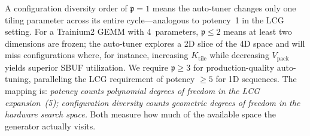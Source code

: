 \documentclass[12pt]{article}
\newcommand{\ConfigDiversity}{\mathfrak{p}}       %
\newcommand{\SBUF}{\textsc{SBUF}}                 %
\begin{document}
\noindent A configuration diversity order of $\ConfigDiversity = 1$ means the auto-tuner changes only one tiling parameter across its entire cycle---analogous to potency~1 in the LCG setting. For a Trainium2 GEMM with 4~parameters, $\ConfigDiversity \le 2$ means at least two dimensions are frozen; the auto-tuner explores a 2D slice of the 4D space and will miss configurations where, for instance, increasing $K_{\mathrm{tile}}$ while decreasing $V_{\mathrm{pack}}$ yields superior \SBUF{} utilization. We require $\ConfigDiversity \ge 3$ for production-quality auto-tuning, paralleling the LCG requirement of potency $\ge 5$ for 1D sequences. The mapping is: \emph{potency counts polynomial degrees of freedom in the LCG expansion~(5); configuration diversity counts geometric degrees of freedom in the hardware search space.} Both measure how much of the available space the generator actually visits.
\end{document}
